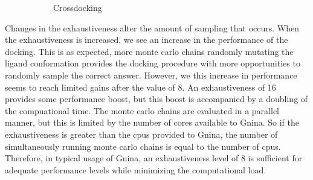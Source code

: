 \documentclass[journal=jcisd8,manuscript=article]{achemso}
\begin{document}
\begin{figure}
\begin{subfigure}[b]{0.48\textwidth}
		\caption{Crossdocking}
		\label{fig:exhaustiveness cd}
        \end{subfigure}    
	\caption{}
	\label{fig:exhaustiveness}
\end{figure}    

Changes in the exhaustiveness alter the amount of sampling that occurs. When the exhaustiveness is increased, we see an increase in the performance of the docking. This is as expected, more monte carlo chains randomly mutating the ligand conformation provides the docking procedure with more opportunities to randomly sample the correct answer. However, we this increase in performance seems to reach limited gains after the value of 8. An exhaustiveness of 16 provides some performance boost, but this boost is accompanied by a doubling of the compuational time. The monte carlo chains are evaluated in a parallel manner, but this is limited by the number of cores available to Gnina. So if the exhaustiveness is greater than the cpus provided to Gnina, the number of simultaneously running monte carlo chains is equal to the number of cpus. Therefore, in typical usage of Gnina, an exhaustiveness level of 8 is sufficient for adequate performance levels while minimizing the computational load.
\end{document}
